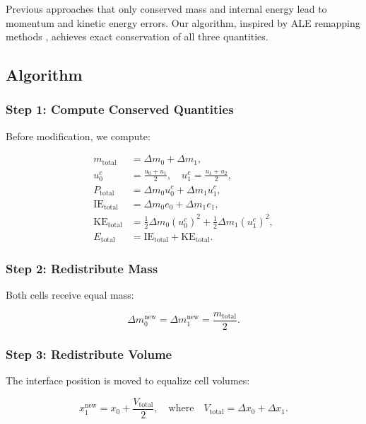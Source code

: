 \documentclass[12pt,a4paper]{article}
\newcommand{\half}{\frac{1}{2}}
\begin{document}
Previous approaches that only conserved mass and internal energy \citep{Benson1992} lead to momentum and kinetic energy errors. Our algorithm, inspired by ALE remapping methods \citep{Margolin2003, Loubere2010}, achieves exact conservation of all three quantities.

\subsection{Algorithm}

\subsubsection{Step 1: Compute Conserved Quantities}

Before modification, we compute:

\begin{align}
    m_{\text{total}} &= \Delta m_0 + \Delta m_1, \\
    u_0^c &= \frac{u_0 + u_1}{2}, \quad u_1^c = \frac{u_1 + u_2}{2}, \\
    P_{\text{total}} &= \Delta m_0 u_0^c + \Delta m_1 u_1^c, \\
    \text{IE}_{\text{total}} &= \Delta m_0 e_0 + \Delta m_1 e_1, \\
    \text{KE}_{\text{total}} &= \half \Delta m_0 (u_0^c)^2 + \half \Delta m_1 (u_1^c)^2, \\
    E_{\text{total}} &= \text{IE}_{\text{total}} + \text{KE}_{\text{total}}.
\end{align}

\subsubsection{Step 2: Redistribute Mass}

Both cells receive equal mass:

\begin{equation}
    \Delta m_0^{\text{new}} = \Delta m_1^{\text{new}} = \frac{m_{\text{total}}}{2}.
\end{equation}

\subsubsection{Step 3: Redistribute Volume}

The interface position is moved to equalize cell volumes:

\begin{equation}
    x_1^{\text{new}} = x_0 + \frac{V_{\text{total}}}{2}, \quad \text{where} \quad V_{\text{total}} = \Delta x_0 + \Delta x_1.
\end{equation}
\end{document}
